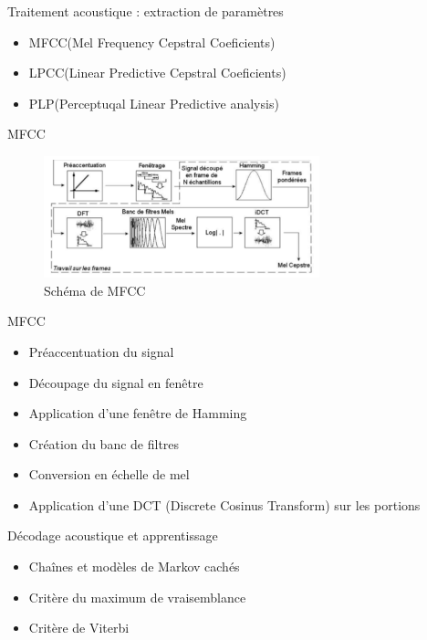 \begin{frame}{Traitement acoustique : extraction de paramètres}
	\begin{itemize}
	\item MFCC(Mel Frequency Cepstral Coeficients)
	\item LPCC(Linear Predictive Cepstral Coeficients)
	\item PLP(Perceptuqal Linear Predictive analysis)
	\end{itemize}
\end{frame}


\begin{frame}{MFCC}

\begin{figure}
\centering
\includegraphics[width=8cm]{images/schema_MFCC.png}
\caption{Schéma de MFCC}
\end{figure}
\end{frame}

\begin{frame}{MFCC}
\begin{itemize}
\item Préaccentuation du signal
\item Découpage du signal en fenêtre
\item Application d’une fenêtre de Hamming
\item Création du banc de filtres
\item Conversion en échelle de mel
\item Application d’une DCT (Discrete Cosinus Transform) sur les portions
\end{itemize}
\end{frame}

\begin{frame}{Décodage acoustique et apprentissage}

\begin{itemize}
\item Chaînes et modèles de Markov cachés  
\item Critère du maximum de vraisemblance
\item Critère de Viterbi
\end{itemize}

\end{frame}

